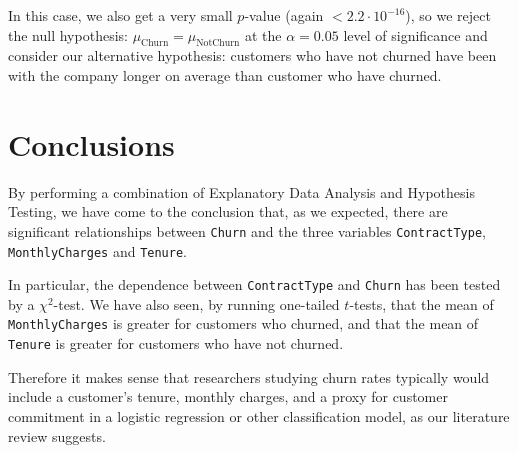 \documentclass[man, floatsintext]{apa6}
\begin{document}
\hspace{0.5mm}

In this case, we also get a very small $p$-value (again $< 2.2 \cdot 10^{-16}$), so we reject the null hypothesis: $\mu_{\text{Churn}} = \mu_{\text{NotChurn}}$ at the $\alpha = 0.05$ level of significance and consider our alternative hypothesis: customers who have not churned have been with the company longer on average than customer who have churned.

\newpage

\section{Conclusions}

By performing a combination of Explanatory Data Analysis and Hypothesis Testing, we have come to the conclusion that, as we expected, there are significant relationships between \texttt{Churn} and the three variables \texttt{ContractType}, \texttt{MonthlyCharges} and \texttt{Tenure}.

In particular, the dependence between \texttt{ContractType} and \texttt{Churn} has been tested by a $\chi^2$-test. We have also seen, by running one-tailed $t$-tests, that the mean of \texttt{MonthlyCharges} is greater for customers who churned, and that the mean of \texttt{Tenure} is greater for customers who have not churned.

Therefore it makes sense that researchers studying churn rates typically would include a customer's tenure, monthly charges, and a proxy for customer commitment in a logistic regression or other classification model, as our literature review suggests.

\printbibliography
\end{document}
